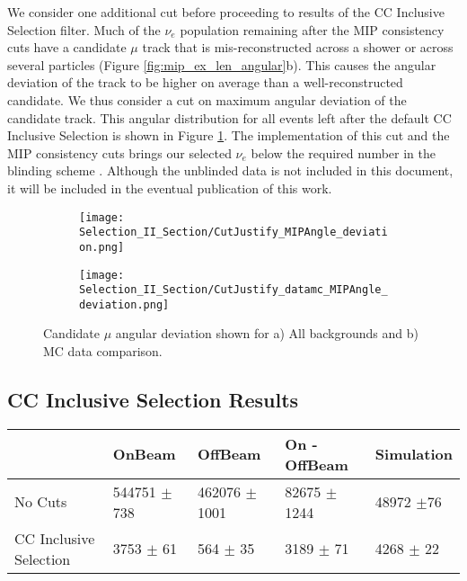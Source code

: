 We consider one additional cut before proceeding to results of the CC Inclusive Selection filter.  Much of the $\nu_e$ population remaining after the MIP consistency cuts have a candidate $\mu$ track that is mis-reconstructed across a shower or across several particles (Figure \ref{fig:mip_ex_len_angular}b).  This causes the angular deviation of the track to be higher on average than a well-reconstructed candidate.  We thus consider a cut on maximum angular deviation of the candidate track.  This angular distribution for all events left after the default CC Inclusive Selection is shown in Figure \ref{fig:cutjust_sel2_multall_deviation}.  The implementation of this cut and the MIP consistency cuts brings our selected $\nu_e$ below the required number in the blinding scheme \cite{bib:jz_unblinding_note}. Although the unblinded data is not included in this document, it will be included in the eventual publication of this work.
\begin{figure}[H]
\centering
  \begin{subfigure}[t]{0.35\textwidth}
    \centering
\texttt{[image: Selection\_II\_Section/CutJustify\_MIPAngle\_deviation.png]}
    \caption{ }
  \end{subfigure} 
  \hspace{30mm}
  \begin{subfigure}[t]{0.35\textwidth}
    \centering
\texttt{[image: Selection\_II\_Section/CutJustify\_datamc\_MIPAngle\_deviation.png]}
    \caption{ }
  \end{subfigure} 
\caption{ Candidate $\mu$ angular deviation shown for a) All backgrounds and b) MC data comparison. }
\label{fig:cutjust_sel2_multall_deviation}
\end{figure}

\clearpage

\subsection{CC Inclusive Selection Results}

\begin{table}[H]
 \centering
 \begin{tabular}{| l | l | l | l | l |}
  \hline
   & OnBeam & OffBeam & On - OffBeam & Simulation \\ [0.1ex] \hline
No Cuts & 544751 $\pm$ 738 & 462076 $\pm$ 1001 & 82675 $\pm$ 1244 & 48972 $\pm$76 \\ 
CC Inclusive Selection& 3753 $\pm$ 61 & 564 $\pm$ 35 & 3189 $\pm$ 71 & 4268 $\pm$ 22  \\ \hline

\end{tabular}
 \end{table}

